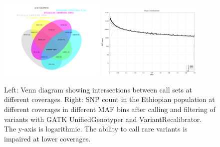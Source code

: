 \begin{figure}[htp]
\centering
\includegraphics[width=0.45\textwidth]{Chapter2/fig/downsampling_ethiopia_venn.png}
\includegraphics[width=0.45\textwidth]{Chapter2/fig/ethiopia_VR.png}
\caption{Left: Venn diagram showing intersections between call sets at different coverages. Right: \gls{SNP} count in the Ethiopian population at different coverages in different \gls{MAF} bins after calling and filtering of variants with \gls{GATK} UnifiedGenotyper and VariantRecalibrator.\cite{DePristo2011} The y-axis is logarithmic. The ability to call rare variants is impaired at lower coverages.}
\label{fig:downsampling_SNP_count}
\end{figure}